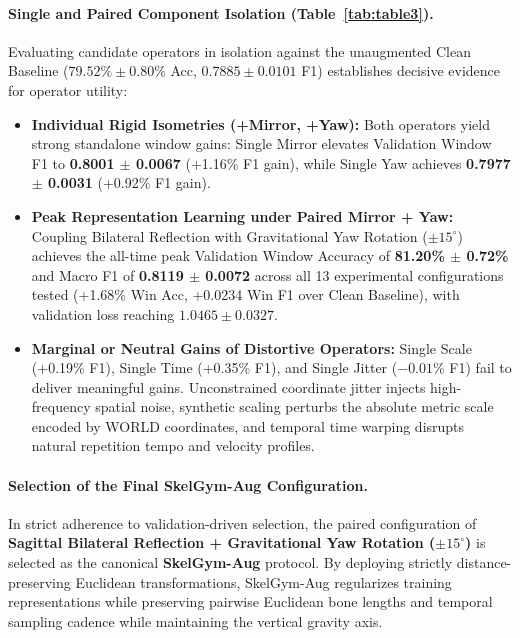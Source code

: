 \documentclass[preprint,12pt]{elsarticle}
\begin{document}
\paragraph{Single and Paired Component Isolation (Table~\ref{tab:table3}).}
Evaluating candidate operators in isolation against the unaugmented Clean Baseline ($79.52\% \pm 0.80\%$ Acc, $0.7885 \pm 0.0101$ F1) establishes decisive evidence for operator utility:
\begin{itemize}
    \item \textbf{Individual Rigid Isometries (+Mirror, +Yaw):} Both operators yield strong standalone window gains: Single Mirror elevates Validation Window F1 to \textbf{0.8001 $\pm$ 0.0067} (+1.16\% F1 gain), while Single Yaw achieves \textbf{0.7977 $\pm$ 0.0031} (+0.92\% F1 gain).
    \item \textbf{Peak Representation Learning under Paired Mirror + Yaw:} Coupling Bilateral Reflection with Gravitational Yaw Rotation ($\pm 15^\circ$) achieves the all-time peak Validation Window Accuracy of \textbf{81.20\% $\pm$ 0.72\%} and Macro F1 of \textbf{0.8119 $\pm$ 0.0072} across all 13 experimental configurations tested (+1.68\% Win Acc, +0.0234 Win F1 over Clean Baseline), with validation loss reaching $1.0465 \pm 0.0327$.
    \item \textbf{Marginal or Neutral Gains of Distortive Operators:} Single Scale (+0.19\% F1), Single Time (+0.35\% F1), and Single Jitter ($-0.01\%$ F1) fail to deliver meaningful gains. Unconstrained coordinate jitter injects high-frequency spatial noise, synthetic scaling perturbs the absolute metric scale encoded by WORLD coordinates, and temporal time warping disrupts natural repetition tempo and velocity profiles.
\end{itemize}

\paragraph{Selection of the Final SkelGym-Aug Configuration.}
In strict adherence to validation-driven selection, the paired configuration of \textbf{Sagittal Bilateral Reflection + Gravitational Yaw Rotation ($\pm 15^\circ$)} is selected as the canonical \textbf{SkelGym-Aug} protocol. By deploying strictly distance-preserving Euclidean transformations, SkelGym-Aug regularizes training representations while preserving pairwise Euclidean bone lengths and temporal sampling cadence while maintaining the vertical gravity axis.
\end{document}
